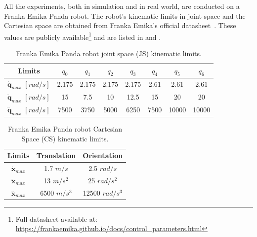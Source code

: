 All the experiments, both in simulation and in real world, are conducted on a Franka Emika Panda robot. The robot's kinematic limits in joint space and the Cartesian space are obtained from Franka Emika's official datasheet~\cite{frankadata}.  These values are publicly available\footnote{\label{note:franka}Full datasheet available at: \url{https://frankaemika.github.io/docs/control_parameters.html}} and are listed in  and .

\begin{table}[h!]
    \centering
    \begin{tabular}{|c|ccccccc|}
        \hline
        Limits & $q_0$ & $q_1$ & $q_2$ & $q_3$ & $q_4$ & $q_5$ & $q_6$ \\
        \hline
        $\dot{\bm{q}}_{max}$ $[{rad}/{s}]$ & 2.175 & 2.175 & 2.175 & 2.175 & 2.61 & 2.61 & 2.61 \\
        $\ddot{\bm{q}}_{max}$ $[{rad}/{s}]$ & 15 & 7.5 & 10 & 12.5 & 15 & 20 & 20 \\
        $\dddot{\bm{q}}_{max}$ $[{rad}/{s}]$ & 7500 & 3750 & 5000 & 6250 & 7500 & 10000 & 10000 \\
        \hline
    \end{tabular}
    \caption{Franka Emika Panda robot joint space (JS) kinematic limits.}
    \label{tab:panda_limits_js}
\end{table}

	
\begin{table}[h]
    \centering
    \begin{tabular}{|c|cc|}
        \hline
        Limits & Translation & Orientation \\
        \hline
        $\dot{\bm{x}}_{max}$ & 1.7 $m/s$ & 2.5 $rad/s$ \\
        $\ddot{\bm{x}}_{max}$ & 13 $m/s^2$ & 25 $rad/s^{2}$\\
        $\dddot{\bm{x}}_{max}$ & 6500 $m/s^3$ & 12500 $rad/s^{3}$\\
        \hline
    \end{tabular}
    \caption{Franka Emika Panda robot Cartesian Space (CS) kinematic limits.}
    \label{tab:franka_limits}
\end{table}

